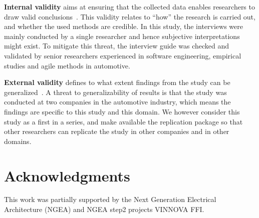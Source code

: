 \documentclass[sigconf]{acmart}
\begin{document}
\textbf{Internal validity} aims at ensuring that the collected data enables researchers to draw valid conclusions~\cite{Creswell2003}. This validity relates to ``how'' the research is carried out, and whether the used methods are credible. In this study, the interviews were mainly conducted by a single researcher and hence subjective interpretations might exist. To mitigate this threat, the interview guide was checked and validated by senior researchers experienced in software engineering, empirical studies and agile methods in automotive.

\textbf{External validity} defines to what extent findings from the study can be generalized~\cite{Creswell2003}. A threat to generalizability of results is that the study was conducted at two companies in the automotive industry, which means the findings are specific to this study and this domain. We however consider this study as a first in a series, and make available the replication package so that other researchers can replicate the study in other companies and in other domains.



%


\section*{Acknowledgments}
This work was partially supported by the Next Generation Electrical
Architecture (NGEA) and NGEA step2 projects VINNOVA FFI.

\balance



\end{document}
